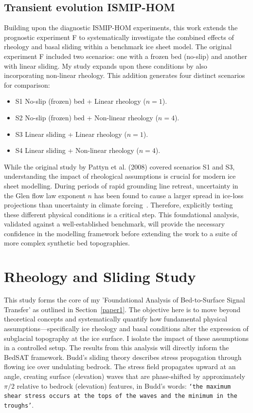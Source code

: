 \subsection{Transient evolution ISMIP-HOM}\label{transient_ismip}
Building upon the diagnostic ISMIP-HOM experiments, this work extends the prognostic experiment F to systematically investigate the combined effects of rheology and basal sliding within a benchmark ice sheet model. The original experiment F included two scenarios: one with a frozen bed (no-slip) and another with linear sliding. My study expands upon these conditions by also incorporating non-linear rheology. This addition generates four distinct scenarios for comparison:
\begin{itemize}
\item{S1} No-slip (frozen) bed + Linear rheology ($n=1$).
\item{S2} No-slip (frozen) bed + Non-linear rheology ($n=4$).
\item{S3} Linear sliding + Linear rheology ($n=1$).
\item{S4} Linear sliding + Non-linear rheology ($n=4$).
\end{itemize}
While the original study by Pattyn et al. (2008) covered scenarios S1 and S3, understanding the impact of rheological assumptions is crucial for modern ice sheet modelling. During periods of rapid grounding line retreat, uncertainty in the Glen flow law exponent $n$ has been found to cause a larger spread in ice-loss projections than uncertainty in climate forcing~\cite{Getraer_2025}. Therefore, explicitly testing these different physical conditions is a critical step. This foundational analysis, validated against a well-established benchmark, will provide the necessary confidence in the modelling framework before extending the work to a suite of more complex synthetic bed topographies.

\section{Rheology and Sliding Study}\label{study1}
This study forms the core of my 'Foundational Analysis of Bed-to-Surface Signal Transfer' as outlined in Section~\ref{paper1}. The objective here is to move beyond theoretical concepts and systematically quantify how fundamental physical assumptions—specifically ice rheology and basal conditions alter the expression of subglacial topography at the ice surface. I isolate the impact of these assumptions in a controlled setup. The results from this analysis will directly inform the BedSAT framework.
Budd's sliding theory describes stress propagation through flowing ice over undulating bedrock. The stress field propagates upward at an angle, creating surface (elevation) waves that are phase-shifted by approximately $\pi/2$ relative to bedrock (elevation) features, in Budd's words: \texttt{\texttt{`the maximum shear stress occurs at the tops of the waves and the minimum in the troughs'\cite{Budd_1970}}}.

